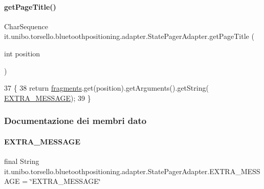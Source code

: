 \paragraph{\texorpdfstring{get\+Page\+Title()}{getPageTitle()}}
{\footnotesize\ttfamily Char\+Sequence it.\+unibo.\+torsello.\+bluetoothpositioning.\+adapter.\+State\+Pager\+Adapter.\+get\+Page\+Title (\begin{DoxyParamCaption}\item[{int}]{position }\end{DoxyParamCaption})}


\begin{DoxyCode}
37                                                    \{
38         \textcolor{keywordflow}{return} \hyperlink{classit_1_1unibo_1_1torsello_1_1bluetoothpositioning_1_1adapter_1_1StatePagerAdapter_a6d30ff8266b65b268d46d03eb30da1db_a6d30ff8266b65b268d46d03eb30da1db}{fragments}.get(position).getArguments().getString(
      \hyperlink{classit_1_1unibo_1_1torsello_1_1bluetoothpositioning_1_1adapter_1_1StatePagerAdapter_ac9b774a91ff682b603f6f2ef409c4bf2_ac9b774a91ff682b603f6f2ef409c4bf2}{EXTRA\_MESSAGE});
39     \}
\end{DoxyCode}


\subsubsection{Documentazione dei membri dato}
\hypertarget{classit_1_1unibo_1_1torsello_1_1bluetoothpositioning_1_1adapter_1_1StatePagerAdapter_ac9b774a91ff682b603f6f2ef409c4bf2_ac9b774a91ff682b603f6f2ef409c4bf2}{}\label{classit_1_1unibo_1_1torsello_1_1bluetoothpositioning_1_1adapter_1_1StatePagerAdapter_ac9b774a91ff682b603f6f2ef409c4bf2_ac9b774a91ff682b603f6f2ef409c4bf2} 
\paragraph{\texorpdfstring{E\+X\+T\+R\+A\+\_\+\+M\+E\+S\+S\+A\+GE}{EXTRA\_MESSAGE}}
{\footnotesize\ttfamily final String it.\+unibo.\+torsello.\+bluetoothpositioning.\+adapter.\+State\+Pager\+Adapter.\+E\+X\+T\+R\+A\+\_\+\+M\+E\+S\+S\+A\+GE = \char`\"{}E\+X\+T\+R\+A\+\_\+\+M\+E\+S\+S\+A\+GE\char`\"{}\hspace{0.3cm}{\ttfamily [static]}}

